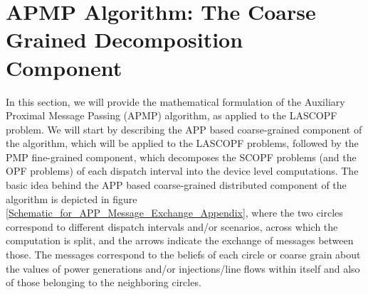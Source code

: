 \documentclass[preprint,12pt,3p]{elsarticle}
\begin{document}
\section{APMP Algorithm: The Coarse Grained Decomposition Component}
\label{APMPAlgo}
In this section, we will provide the mathematical formulation of the Auxiliary Proximal Message Passing (APMP) algorithm, as applied to the LASCOPF problem. We will start by describing the APP based coarse-grained component of the algorithm, which will be applied to the LASCOPF problems, followed by the PMP fine-grained component, which decomposes the SCOPF problems (and the OPF problems) of each dispatch interval into the device level computations. The basic idea behind the APP based coarse-grained distributed component of the algorithm is depicted in figure \ref{Schematic_for_APP_Message_Exchange_Appendix}, where the two circles correspond to different dispatch intervals and/or scenarios, across which the computation is split, and the arrows indicate the exchange of messages between those. The messages correspond to the beliefs of each circle or coarse grain about the values of power generations and/or injections/line flows within itself and also of those belonging to the neighboring circles.
\end{document}
